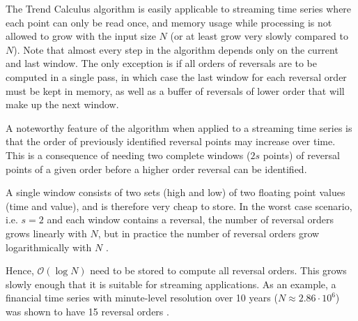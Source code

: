 \documentclass[../trend-calculus.tex]{subfiles}
\begin{document}
  The Trend Calculus algorithm is easily applicable to 
  streaming time series where each point can only be read once, and 
  memory usage while processing is not allowed to grow with the input size $N$ 
  (or at least grow very slowly compared to $N$).
  Note that almost every step in the algorithm 
  depends only on the current and last window.
  The only exception is if all orders of reversals are to be computed in a single pass, 
  in which case the last window for each reversal order must be kept in memory, 
  as well as a buffer of reversals of lower order that will make up the next window.

  A noteworthy feature of the algorithm when applied 
  to a streaming time series is that the order of 
  previously identified reversal points may increase over time.
  This is a consequence of needing two complete windows ($2s$ points)
  of reversal points of a given order before a higher order reversal can be identified.

  A single window consists of two sets (high and low) of two floating point values 
  (time and value), and is therefore very cheap to store.
  In the worst case scenario,
  i.e. $s = 2$ and each window contains a reversal,
  the number of reversal orders grows linearly with $N$, but
  in practice the number of reversal orders grow logarithmically with $N$ \cite{trendcalculus}.
  
  Hence, $\mathcal{O}(\log N)$ need to be stored to compute all reversal orders.
  This grows slowly enough that it is suitable for streaming applications.
  As an example, a financial time series with minute-level resolution over 10 years 
  ($N \approx 2.86 \cdot 10^6$) was shown to have 15 reversal orders \cite{spark-trendcalculus-examples}.
\end{document}
